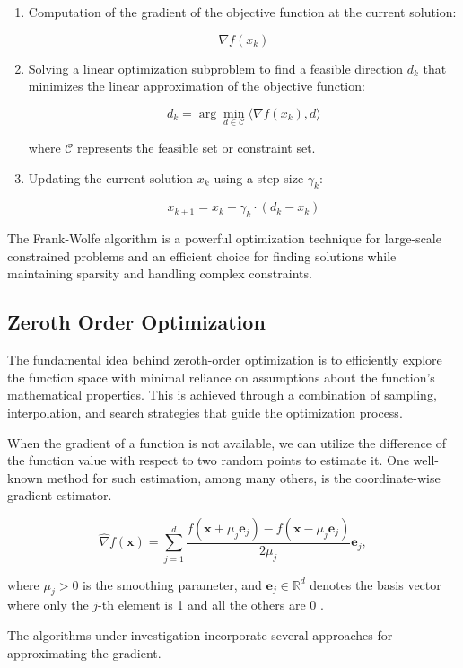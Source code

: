 \begin{multicols}{2}
\begin{enumerate}
    \item Computation of the gradient of the objective function at the current solution:
       
       \[ \nabla f(x_k) \]
    
    \item Solving a linear optimization subproblem to find a feasible direction \(d_k\) 
          that minimizes the linear approximation of the objective function:
    
       \[ d_k = \arg\min_{d \in \mathcal{C}} \langle \nabla f(x_k), d \rangle \]
    
       where \(\mathcal{C}\) represents the feasible set or constraint set.
    
    \item Updating the current solution \(x_k\) using a step size \(\gamma_k\):
    
       \[ x_{k+1} = x_k + \gamma_k \cdot (d_k - x_k) \]
    \end{enumerate}

    The Frank-Wolfe algorithm is a powerful optimization technique for large-scale 
    constrained problems and an efficient choice for finding solutions 
    while maintaining sparsity and handling complex constraints.

\subsection{Zeroth Order Optimization}

The fundamental idea behind zeroth-order optimization is to efficiently 
explore the function space with minimal reliance on assumptions about 
the function's mathematical properties.
This is achieved through a combination of sampling, interpolation,
and search strategies that guide the optimization process.

When the gradient of a function is not available, we can utilize the difference 
of the function value with respect to two random points to estimate it. 
One well-known method for such estimation, among many others, is the 
coordinate-wise gradient estimator.

\begin{equation}
\hat{\nabla} f(\mathbf{x})=\sum_{j=1}^d \frac{f\left(\mathbf{x}+\mu_j \mathbf{e}_j\right)-f\left(\mathbf{x}-\mu_j \mathbf{e}_j\right)}{2 \mu_j} \mathbf{e}_j,
\label{eq:coorwise-estim}
\end{equation}

where $\mu_j>0$ is the smoothing parameter, and $\mathbf{e}_j \in \mathbb{R}^d$ 
denotes the basis vector where only the $j$-th element is 1 and all the others are 0 . 

The algorithms under investigation incorporate several approaches for 
approximating the gradient.

\medskip
\printbibliography %

\end{multicols}%

